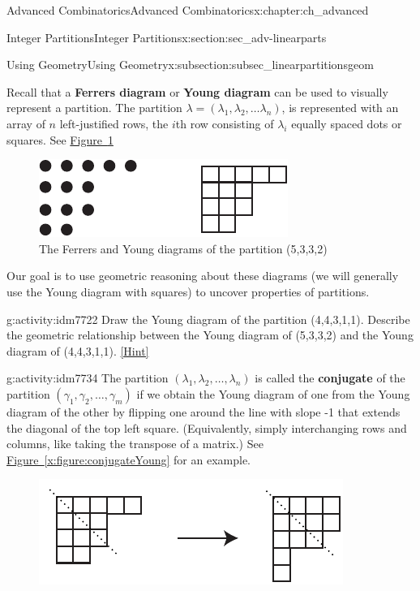 \documentclass[oneside,10pt,]{book}
\newcommand{\terminology}[1]{\textbf{#1}}
\numberwithin{equation}{chapter}
\begin{document}
\begin{chapterptx}{Advanced Combinatorics}{}{Advanced Combinatorics}{}{}{x:chapter:ch_advanced}
\begin{sectionptx}{Integer Partitions}{}{Integer Partitions}{}{}{x:section:sec_adv-linearparts}
\typeout{************************************************}
%
\begin{subsectionptx}{Using Geometry}{}{Using Geometry}{}{}{x:subsection:subsec_linearpartitionsgeom}
\begin{introduction}{}%
Recall that a \terminology{Ferrers diagram} or \terminology{Young diagram} can be used to visually represent a partition.  The partition \(\lambda = (\lambda_1,\lambda_2,\ldots \lambda_n)\), is represented with an array of \(n\) left-justified rows, the \(i\)th row consisting of \(\lambda_i\) equally spaced dots or squares.  See \hyperref[x:figure:FerrersYoung-repeat]{Figure~\ref{x:figure:FerrersYoung-repeat}}%
\begin{figure}
\centering
\includegraphics[width=0.45\linewidth]{images/FerrersYoung}
\caption{The Ferrers and Young diagrams of the partition (5,3,3,2)\label{x:figure:FerrersYoung-repeat}}
\end{figure}
Our goal is to use geometric reasoning about these diagrams (we will generally use the Young diagram with squares) to uncover properties of partitions.%
\begin{activity}{}{g:activity:idm7722}%
Draw the Young diagram of the partition (4,4,3,1,1). Describe the geometric relationship between the Young diagram of (5,3,3,2) and the Young diagram of (4,4,3,1,1).%
\space\hspace*{0pt}\hfill{\tiny\hyperlink{g:hint:idm7725-back}{[Hint]}}\end{activity}
\begin{activity}{}{g:activity:idm7734}%
The partition \((\lambda_1,\lambda_2,\ldots, \lambda_n)\) is called the \terminology{conjugate} of the partition \((\gamma_1,\gamma_2,\ldots, \gamma_m)\) if we obtain the Young diagram of one from the Young diagram of the other by flipping one around the line with slope -1 that extends the diagonal of the top left square. (Equivalently, simply interchanging rows and columns, like taking the transpose of a matrix.) See \hyperref[x:figure:conjugateYoung]{Figure~\ref{x:figure:conjugateYoung}} for an example.%
\begin{figure}
\centering
\includegraphics[width=0.5\linewidth]{images/conjugateYoung}

\end{figure}
\end{activity}
\end{introduction}
\end{subsectionptx}
\end{sectionptx}
\end{chapterptx}
\end{document}

